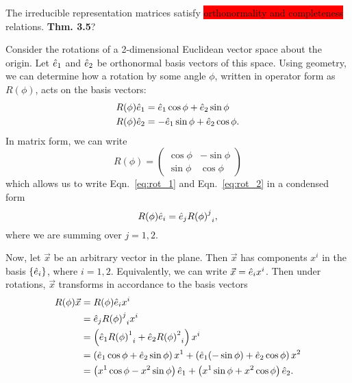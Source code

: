 The irreducible representation matrices satisfy \colorbox{red}{orthonormality and completeness} relations.\textbf{ Thm. 3.5}?

\begin{example}
    Consider the rotations of a 2-dimensional Euclidean vector space about the origin. Let $\hat{e}_1$ and $\hat{e}_2$ be orthonormal basis vectors of this space. Using geometry, we can determine how a rotation by some angle $\phi$, written in operator form as $R(\phi)$, acts on the basis vectors:
    \begin{align}
        R(\phi)\hat{e}_1 &= \hat{e}_1\cos\phi + \hat{e}_2\sin\phi \label{eq:rot_1}\\
        R(\phi)\hat{e}_2 &= -\hat{e}_1\sin\phi + \hat{e}_2\cos\phi.\label{eq:rot_2}
    \end{align}
    In matrix form, we can write
    \begin{equation}
        R(\phi) = 
        \begin{pmatrix}
            \cos\phi & -\sin\phi \\
            \sin\phi & \cos\phi
        \end{pmatrix}
    \end{equation}
    which allows us to write Eqn.~\ref{eq:rot_1} and Eqn.~\ref{eq:rot_2} in a condensed form
    \begin{equation}
        R(\phi)\hat{e}_i = \hat{e}_j{{R(\phi)}^j}_i,
    \end{equation}
    where we are summing over $j=1,2$.

    Now, let $\vec{x}$ be an arbitrary vector in the plane. Then $\vec{x}$ has components $x^i$ in the basis $\{\hat{e}_i\}$, where $i=1,2$. Equivalently, we can write $\vec{x}=\hat{e}_i x^i$. Then under rotations, $\vec{x}$ transforms in accordance to the basis vectors
    \begin{align}
        R(\phi)\vec{x} &= R(\phi)\hat{e}_i x^i \label{eq:rot_vec} \\
        &= \hat{e}_j{{R(\phi)}^j}_i x^i \nonumber \\
        &= \left( \hat{e}_1{{R(\phi)}^1}_i + \hat{e}_2{{R(\phi)}^2}_i \right)x^i \nonumber \\
        &= \left( \hat{e}_1\cos\phi + \hat{e}_2\sin\phi \right) x^1 + \left( \hat{e}_1(-\sin\phi) + \hat{e}_2\cos\phi \right) x^2 \nonumber \\
        &= \left( x^1\cos\phi - x^2\sin\phi \right)\hat{e}_1 + \left( x^1\sin\phi + x^2\cos\phi \right)\hat{e}_2.  \nonumber
    \end{align}


\end{example}
